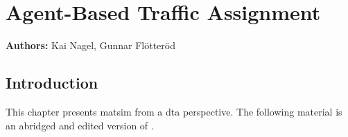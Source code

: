 \def\todoNextRevision#1{{\color{blue}[[``todo next revision'': #1]]}}

\chapter{Agent-Based Traffic Assignment}
\label{ch:abta}

\hfill \textbf{Authors:} Kai Nagel, Gunnar Flötteröd



\section{Introduction}
\label{sec:agenbased-dta-intro}

This chapter presents \gls{matsim} from a \gls{dta} perspective. 
The following material is an abridged and edited version of \citet{NagelFloetteroed2009IatbrResourceInBook}.







